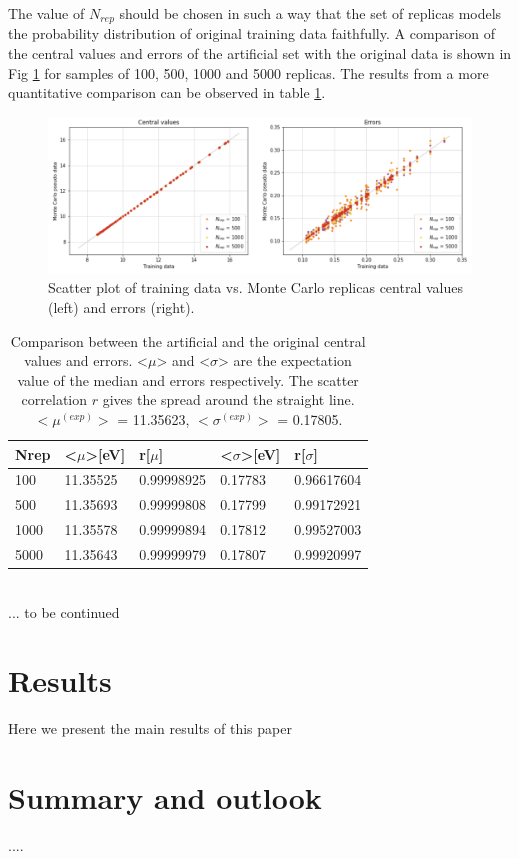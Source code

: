 \documentclass[11pt,a4paper]{article}
\numberwithin{equation}{section}
\numberwithin{figure}{section}
\numberwithin{table}{section}
\begin{document}
The value of $N_{rep}$ should be chosen in such a way that the set of replicas models the probability distribution of original training data faithfully. A comparison of the central values and errors of the artificial set with the original data is shown in Fig \ref{mc} for samples of 100, 500, 1000 and 5000 replicas. The results from a more quantitative comparison can be observed in table \ref{tablemc}.

\begin{figure}[H]
    \centering 
    \includegraphics[width=160mm]{plots/MC.png}
    \caption{Scatter plot of training data vs. Monte Carlo replicas central values (left) and errors (right). }
    \label{mc}
\end{figure}

\begin{table}[H]
\begin{tabular}{|l|ll|ll|}
\hline
Nrep & \textless{}$\mu$\textgreater {[}eV{]} & r{[}$\mu${]} & \textless{}$\sigma$\textgreater {[}eV{]} & r{[}$\sigma${]} \\ \hline
100  & 11.35525                              & 0.99998925   & 0.17783                                  & 0.96617604      \\ \hline
500  & 11.35693                              & 0.99999808   & 0.17799                                  & 0.99172921      \\ \hline
1000 & 11.35578                              & 0.99999894   & 0.17812                                  & 0.99527003      \\ \hline
5000 & 11.35643                              & 0.99999979   & 0.17807                                  & 0.99920997      \\ \hline
\end{tabular}
\caption{Comparison between the artificial and the original central values and errors. <$\mu$> and <$\sigma$> are the expectation value of the median and errors respectively. The scatter correlation $r$ gives the spread around the straight line. $<\mu^{(exp)}>$ = 11.35623, $<\sigma^{(exp)}>$ = 0.17805. }
\label{tablemc}
\end{table}


\\
... to be continued

\section{Results}
Here we present the main results of this paper

\section{Summary and outlook}
....


\end{document}
